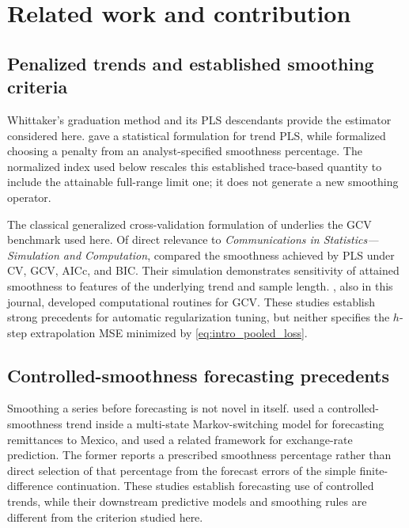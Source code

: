 \section{Related work and contribution}
\label{sec:related_work}

\subsection{Penalized trends and established smoothing criteria}

Whittaker's graduation method \citep{whittaker1923}
and its PLS descendants provide the estimator
considered here. \citet{guerrero2007penalized}
gave a statistical formulation for trend PLS,
while \citet{guerrero2008smoothness} formalized
choosing a penalty from an analyst-specified
smoothness percentage. The normalized index
used below rescales this established trace-based
quantity to include the attainable full-range
limit one; it does not generate a new
smoothing operator.

The classical generalized cross-validation formulation of
\citet{craven1979gcv} underlies the GCV benchmark used
here. Of direct relevance to \emph{Communications in
Statistics---Simulation and Computation},
\citet{cortes2017smoothness} compared the
smoothness achieved by PLS under CV, GCV,
AICc, and BIC. Their simulation demonstrates
sensitivity of attained smoothness to
features of the underlying trend and sample
length. \citet{bates1987gcvpack}, also in
this journal, developed computational
routines for GCV. These studies establish
strong precedents for automatic regularization
tuning, but neither specifies the
$h$-step extrapolation MSE minimized
by \cref{eq:intro_pooled_loss}.

\subsection{Controlled-smoothness forecasting precedents}

Smoothing a series before forecasting is
not novel in itself. \citet{islas2019remittances}
used a controlled-smoothness trend inside
a multi-state Markov-switching model for
forecasting remittances to Mexico, and
\citet{islas2025exchange} used a related
framework for exchange-rate prediction.
The former reports a prescribed smoothness
percentage rather than direct selection of
that percentage from the forecast errors
of the simple finite-difference continuation.
These studies establish forecasting use of
controlled trends, while their downstream
predictive models and smoothing rules
are different from the criterion studied here.

